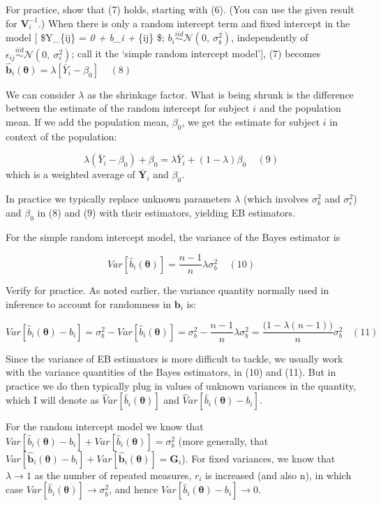 \documentclass[
  9pt,
  ignorenonframetext,
]{beamer}
\begin{document}
\begin{frame}{}
\protect\hypertarget{section-8}{}
For practice, show that (7) holds, starting with (6). (You can use the
given result for \(\pmb V_i^{-1}\).) When there is only a random
intercept term and fixed intercept in the model {[} \$Y\_\{ij\} =
\beta\emph{0 + b\_i + \epsilon}\{ij\} \$;
\(b_i \stackrel {iid} \sim \mathcal N(0,\ \sigma_b^2)\), independently
of
\(\epsilon_{ij} \stackrel {iid} \sim \mathcal N (0,\ \sigma_{\epsilon}^2)\);
call it the `simple random intercept model'{]}, (7) becomes
\(\pmb {\hat b}_i (\pmb \theta)=\lambda[\bar Y_i- \beta_0]\ \ \ \ \ (8)\)

We can consider \(\lambda\) as the shrinkage factor. What is being
shrunk is the difference between the estimate of the random intercept
for subject \(i\) and the population mean. If we add the population
mean, \(\beta_0\), we get the estimate for subject \(i\) in context of
the population:

\[
\lambda(\bar Y_i- \beta_0)+ \beta_0 = \lambda\bar Y_i+(1-\lambda) \beta_0\ \ \ \ \ (9)
\] which is a weighted average of \(\pmb {\bar Y}_i\) and \(\beta_0\).

In practice we typically replace unknown parameters \(\lambda\) (which
involves \(\sigma_b^2\) and \(\sigma_\epsilon^2\)) and \(\beta_0\) in
(8) and (9) with their estimators, yielding EB estimators.

For the simple random intercept model, the variance of the Bayes
estimator is

\[
Var[{\hat b}_i (\pmb \theta)]= \frac {n-1} n  \lambda \sigma_b^2\ \ \ \ \ (10)
\]
\end{frame}

\begin{frame}{Verify for practice.}
\protect\hypertarget{verify-for-practice.}{}
As noted earlier, the variance quantity normally used in inference to
account for randomness in \(\pmb b_i\) is:

\[
Var[{\hat b}_i (\pmb \theta)-b_i]=\sigma_b^2 - Var[{\hat b}_i (\pmb \theta)] 
=\sigma_b^2 - \frac {n-1} n \lambda \sigma_b^2  = \frac {\big(1-\lambda (n-1)\big)} n   \sigma_b^2 \ \ \ \ (11)
\]

Since the variance of EB estimators is more difficult to tackle, we
usually work with the variance quantities of the Bayes estimators, in
(10) and (11). But in practice we do then typically plug in values of
unknown variances in the quantity, which I will denote as
\(\widehat Var[{\hat b}_i (\pmb \theta)]\) and
\(\widehat Var[{\hat b}_i (\pmb \theta)-b_i]\).

For the random intercept model we know that
\(Var[{\hat b}_i (\pmb \theta)-b_i] + Var[{\hat b}_i (\pmb \theta)]=\sigma_b^2\)
(more generally, that
\(Var[ \pmb {\hat b}_i (\pmb \theta)-b_i]+Var[ \pmb {\hat b}_i (\pmb \theta)]=\pmb G_i\)).
For fixed variances, we know that \(\lambda \rightarrow 1\) as the
number of repeated measures, \(r_i\) is increased (and also n), in which
case \(Var[{\hat b}_i (\pmb \theta)] \rightarrow \sigma_b^2\), and hence
\(Var[{\hat b}_i (\pmb \theta)-b_i]\rightarrow0\).
\end{frame}
\end{document}
